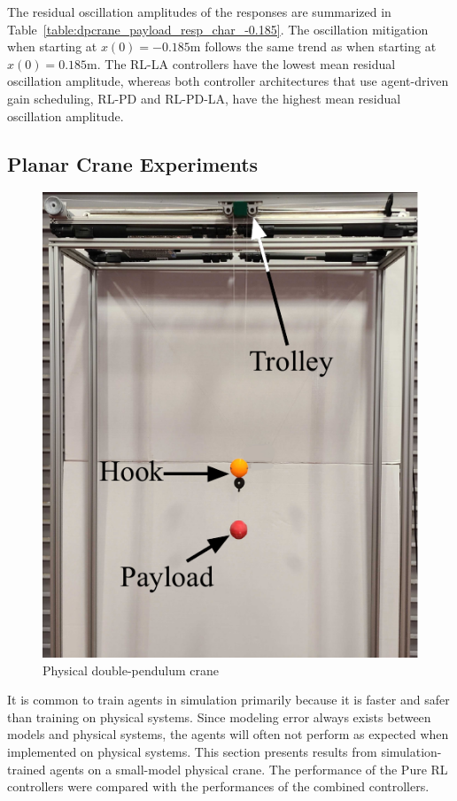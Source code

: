 %
The residual oscillation amplitudes of the responses are summarized in Table~\ref{table:dpcrane_payload_resp_char_-0.185}. The oscillation mitigation when starting at $x(0)=-0.185\si{\meter}$ follows the same trend as when starting at $x(0)=0.185\si{\meter}$. The RL-LA controllers have the lowest mean residual oscillation amplitude, whereas both controller architectures that use agent-driven gain scheduling, RL-PD and RL-PD-LA, have the highest mean residual oscillation amplitude.


\subsection{Planar Crane Experiments}

\begin{figure}[tb]
        \centering
        \includegraphics[width=0.5\columnwidth]{figures/figures_RL_model_based_control/Point_Double_pendulum_crane.pdf}
        \caption{Physical double-pendulum crane}
        \label{fig_chap2:physical_planar_crane}
\end{figure}
%
It is common to train agents in simulation primarily because it is faster and safer than training on physical systems. Since modeling error always exists between models and physical systems, the agents will often not perform as expected when implemented on physical systems. This section presents results from simulation-trained agents on a small-model physical crane. The performance of the Pure RL controllers were compared with the performances of the combined controllers.

